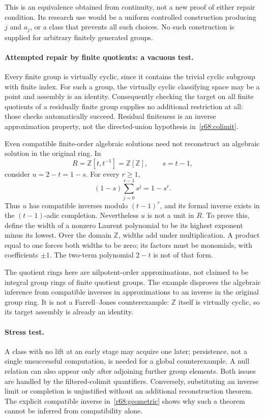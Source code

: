 \documentclass[11pt,a4paper]{article}
\newcommand{\Z}{\mathbb{Z}}
\numberwithin{equation}{section}
\begin{document}
This is an equivalence obtained from continuity, not a new proof of either repair condition. Its research use would be a uniform controlled construction producing $j$ and $a_j$, or a class that prevents all such choices. No such construction is supplied for arbitrary finitely generated groups.

\paragraph{Attempted repair by finite quotients: a vacuous test.}
Every finite group is virtually cyclic, since it contains the trivial cyclic subgroup with finite index. For such a group, the virtually cyclic classifying space may be a point and assembly is an identity. Consequently checking the target on all finite quotients of a residually finite group supplies no additional restriction at all: those checks automatically succeed. Residual finiteness is an inverse approximation property, not the directed-union hypothesis in~\eqref{r68:colimit}.

Even compatible finite-order algebraic solutions need not reconstruct an algebraic solution in the original ring. In
\[
 R=\Z[t,t^{-1}]=\Z[\Z],\qquad s=t-1,
\]
consider $u=2-t=1-s$. For every $r\ge1$,
\begin{equation}\label{r68:geometric}
 (1-s)\sum_{j=0}^{r-1}s^j=1-s^r.
\end{equation}
Thus $u$ has compatible inverses modulo $(t-1)^r$, and its formal inverse exists in the $(t-1)$-adic completion. Nevertheless $u$ is not a unit in $R$. To prove this, define the width of a nonzero Laurent polynomial to be its highest exponent minus its lowest. Over the domain $\Z$, widths add under multiplication. A product equal to one forces both widths to be zero; its factors must be monomials, with coefficients $\pm1$. The two-term polynomial $2-t$ is not of that form.

The quotient rings here are nilpotent-order approximations, not claimed to be integral group rings of finite quotient groups. The example disproves the algebraic inference from compatible inverses in approximations to an inverse in the original group ring. It is not a Farrell--Jones counterexample: $\Z$ itself is virtually cyclic, so its target assembly is already an identity.

\paragraph{Stress test.}
A class with no lift at an early stage may acquire one later; persistence, not a single unsuccessful computation, is needed for a global counterexample. A null relation can also appear only after adjoining further group elements. Both issues are handled by the filtered-colimit quantifiers. Conversely, substituting an inverse limit or completion is unjustified without an additional reconstruction theorem. The explicit compatible inverse in~\eqref{r68:geometric} shows why such a theorem cannot be inferred from compatibility alone.
\end{document}
